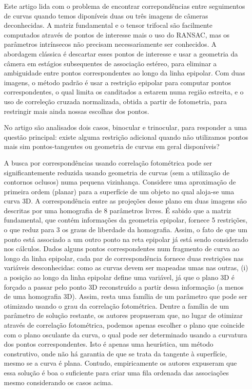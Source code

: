 Este artigo lida com o problema de encontrar correpondências entre seguimentos de curvas quando temos diponíveis duas ou três imagens de câmeras deconhecidas. A matriz fundamental e o tensor trifocal são facilmente computados através de pontos de interesse mais o uso do RANSAC, mas os parâmetros intrínsecos não precisam necessariamente ser conhecidos. A abordagem clássica é descartar esses pontos de interesse e usar a geometria da câmera em estágios subsequentes de associação estéreo, para eliminar a ambiguidade entre pontos correspondentes ao longo da linha epipolar. Com duas imagens, o método padrão é usar a restrição epipolar para computar pontos correspondentes, o qual limita os canditados a estarem numa região estreita, e o uso de correleção cruzada normalizada, obtida a partir de fotometria, para restringir mais ainda nossas escolhas dos pontos. 

No artigo são analisados dois casos, binocular e trinocular, para responder a uma questão principal: existe alguma restrição adicional quando não utilizamos pontos mais sim pontos-tangentes ou geometria de curvas em geral disponíveis?\\


A busca por correspondências usando correlação fotométrica pode ser significantemente reduzida usando geometria de curvas (sem a utilização de contornos oclusos) numa pequena vizinhança. Considere uma aproximação de primeira ordem (planar) para a superfície de um objeto no qual aloja-se uma curva 3D. A correspondência entre as projeções desse plano em duas imagens são descritas por uma homografia de 8 parâmetros livres. É sabido que a matriz fundamental, que contém informações da geometria epipolar, fornece 5 restrições, o que reduz para 3 os graus de liberdade da homografia. Assim, o fato de que um ponto está associado a um outro ponto na reta epipolar já está sendo considerado nos cálculos. Dados alguns pontos correspondentes num fragmento de curva ao longo da linha epipolar, cada par de correspondência fornece duas restrições nas variáveis desconhecidas: como as curvas devem ser mapeadas umas nas outras, (i) a posição ao longo da linha epipolar define uma variável, já que o plano 3D é forçado a passar pelo ponto 3D reconstruído a partir dessa informação (a menos de uma homografia 3D). Assim, resta uma família de um parâmetro que pode ser otimizado usando o grau da correlação fotométrica. Dentre a família de um parâmetro de solução restante, os autores propuseram que, no lugar de otimizar através de correlação fotométrica, podemos apenas escolher o plano que coincide com o plano osculante da curva, o qual pode ser determinado usando a curvatura dos pontos correspondentes. Isto é apenas uma heurística, um método construtivo, onde não há garantia de que se trata da tangente à superfície, mesmo se a curva é plana. Contudo, empiricamente os autores expuseram que essa solução é boa o suficiente para criar uma fila ordenada das associações mesmo considerando os casos acima.


